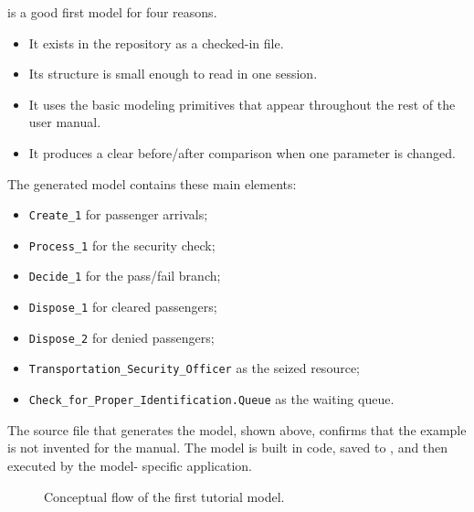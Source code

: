  is a good first model for four reasons.

\begin{itemize}
\item It exists in the repository as a checked-in file.
\item Its structure is small enough to read in one session.
\item It uses the basic modeling primitives that appear throughout the rest of
the user manual.
\item It produces a clear before/after comparison when one parameter is changed.
\end{itemize}

The generated model contains these main elements:
\begin{itemize}
\item \texttt{Create\_1} for passenger arrivals;
\item \texttt{Process\_1} for the security check;
\item \texttt{Decide\_1} for the pass/fail branch;
\item \texttt{Dispose\_1} for cleared passengers;
\item \texttt{Dispose\_2} for denied passengers;
\item \texttt{Transportation\_Security\_Officer} as the seized resource;
\item \texttt{Check\_for\_Proper\_Identification.Queue} as the waiting queue.
\end{itemize}

The source file that generates the model, shown above, confirms that the
example is not invented for the manual. The model is built in code, saved to
, and then executed by the model-
specific application.

\begin{figure}[htbp]
\centering
\caption{Conceptual flow of the first tutorial model.}
\label{fig:first-model-conceptual-flow}
\end{figure}

